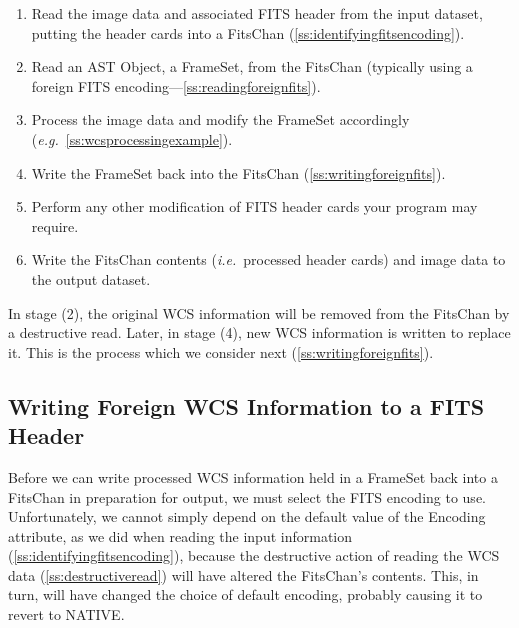 \documentclass[twoside,11pt]{article}
\newcommand{\secref}[1]{\S\ref{#1}}
\renewcommand{\secref}[1]{\ref{#1}}
\begin{document}
\begin{enumerate}
\item Read the image data and associated FITS header from the input
dataset, putting the header cards into a FitsChan
(\secref{ss:identifyingfitsencoding}).

\item Read an AST Object, a FrameSet, from the FitsChan (typically
using a foreign FITS encoding---\secref{ss:readingforeignfits}).

\item Process the image data and modify the FrameSet accordingly
({\em{e.g.}}~\secref{ss:wcsprocessingexample}).

\item Write the FrameSet back into the FitsChan
(\secref{ss:writingforeignfits}).

\item Perform any other modification of FITS header cards your program
may require.

\item Write the FitsChan contents ({\em{i.e.}}\ processed header
cards) and image data to the output dataset.
\end{enumerate}

In stage (2), the original WCS information will be removed from the
FitsChan by a destructive read. Later, in stage (4), new WCS
information is written to replace it. This is the process which we
consider next (\secref{ss:writingforeignfits}).

\subsection{\label{ss:writingforeignfits}Writing Foreign WCS Information to a FITS Header}

Before we can write processed WCS information held in a FrameSet back
into a FitsChan in preparation for output, we must select the FITS
encoding to use.  Unfortunately, we cannot simply depend on the
default value of the Encoding attribute, as we did when reading the
input information (\secref{ss:identifyingfitsencoding}), because the
destructive action of reading the WCS data
(\secref{ss:destructiveread}) will have altered the FitsChan's
contents. This, in turn, will have changed the choice of default
encoding, probably causing it to revert to NATIVE.
\end{document}
